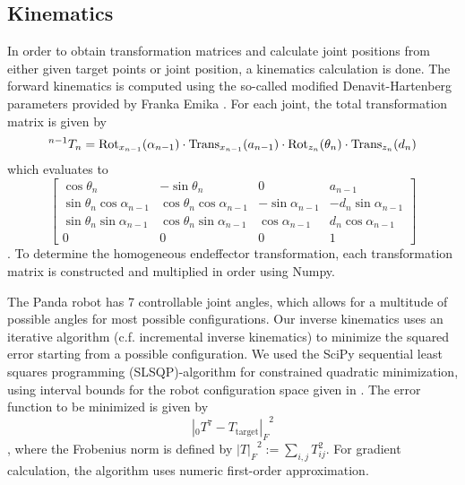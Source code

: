 \subsection{Kinematics}
In order to obtain transformation matrices and calculate joint positions from either given target points or joint position, a kinematics calculation is done. 
The forward kinematics is computed using the so-called modified Denavit-Hartenberg parameters provided by Franka Emika \cite{panda-spec}. For each joint, the total transformation matrix is given by 
\begin{equation}
    {}^{n - 1}T_n  = \operatorname{Rot}_{x_{n-1}}(\alpha_{n-1}) \cdot \operatorname{Trans}_{x_{n-1}}(a_{n-1}) \cdot \operatorname{Rot}_{z_{n}}(\theta_n) \cdot \operatorname{Trans}_{z_{n}}(d_n) \\
\end{equation}
which evaluates to 
$$
\left[
\begin{array}{ccc|c}
    \cos\theta_n & -\sin\theta_n  & 0 & a_{n-1} \\
    \sin\theta_n \cos\alpha_{n-1} & \cos\theta_n \cos\alpha_{n-1} & -\sin\alpha_{n-1} & -d_n \sin\alpha_{n-1} \\
    \sin\theta_n\sin\alpha_{n-1} & \cos\theta_n \sin\alpha_{n-1} & \cos\alpha_{n-1} & d_n \cos\alpha_{n-1} \\
    \hline
    0 & 0 & 0 & 1
  \end{array}
\right]
$$
\cite{wiki-denavit-hartenberg}.
To determine the homogeneous endeffector transformation, each transformation matrix is constructed and multiplied in order using Numpy. 

The Panda robot has 7 controllable joint angles, which allows for a multitude of possible angles for most possible configurations. Our inverse kinematics uses an iterative algorithm (c.f. incremental inverse kinematics) to minimize the squared error starting from a possible configuration. 
We used the SciPy sequential least squares programming (SLSQP)-algorithm for constrained quadratic minimization, using interval bounds for the robot configuration space given in \cite{panda-spec}. The error function to be minimized is given by
$$
{|{}_0T^7 - T_{\text{target}}|_F}^2
$$, where the Frobenius norm is defined by ${|T|_F}^2 := \sum_{i,j} T_{ij}^2$. For gradient calculation, the algorithm uses numeric first-order approximation.

